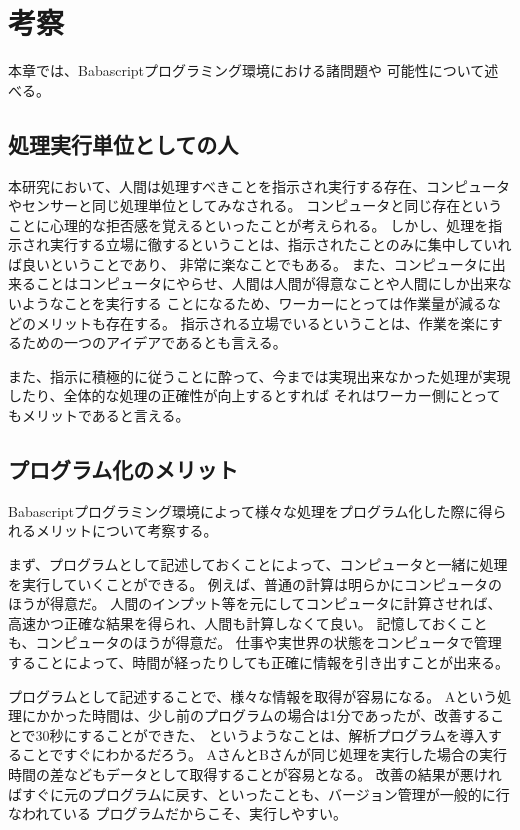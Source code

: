 \chapter{考察}\label{chap:discussion}

本章では、Babascriptプログラミング環境における諸問題や
可能性について述べる。

\section{処理実行単位としての人}\label{ux51e6ux7406ux5b9fux884cux5358ux4f4dux3068ux3057ux3066ux306eux4eba}

本研究において、人間は処理すべきことを指示され実行する存在、コンピュータやセンサーと同じ処理単位としてみなされる。
コンピュータと同じ存在ということに心理的な拒否感を覚えるといったことが考えられる。
しかし、処理を指示され実行する立場に徹するということは、指示されたことのみに集中していれば良いということであり、
非常に楽なことでもある。
また、コンピュータに出来ることはコンピュータにやらせ、人間は人間が得意なことや人間にしか出来ないようなことを実行する
ことになるため、ワーカーにとっては作業量が減るなどのメリットも存在する。
指示される立場でいるということは、作業を楽にするための一つのアイデアであるとも言える。

また、指示に積極的に従うことに酔って、今までは実現出来なかった処理が実現したり、全体的な処理の正確性が向上するとすれば
それはワーカー側にとってもメリットであると言える。

\section{プログラム化のメリット}\label{ux30d7ux30edux30b0ux30e9ux30e0ux5316ux306eux30e1ux30eaux30c3ux30c8}

Babascriptプログラミング環境によって様々な処理をプログラム化した際に得られるメリットについて考察する。

まず、プログラムとして記述しておくことによって、コンピュータと一緒に処理を実行していくことができる。
例えば、普通の計算は明らかにコンピュータのほうが得意だ。
人間のインプット等を元にしてコンピュータに計算させれば、高速かつ正確な結果を得られ、人間も計算しなくて良い。
記憶しておくことも、コンピュータのほうが得意だ。
仕事や実世界の状態をコンピュータで管理することによって、時間が経ったりしても正確に情報を引き出すことが出来る。

プログラムとして記述することで、様々な情報を取得が容易になる。
Aという処理にかかった時間は、少し前のプログラムの場合は1分であったが、改善することで30秒にすることができた、
というようなことは、解析プログラムを導入することですぐにわかるだろう。
AさんとBさんが同じ処理を実行した場合の実行時間の差などもデータとして取得することが容易となる。
改善の結果が悪ければすぐに元のプログラムに戻す、といったことも、バージョン管理が一般的に行なわれている
プログラムだからこそ、実行しやすい。

